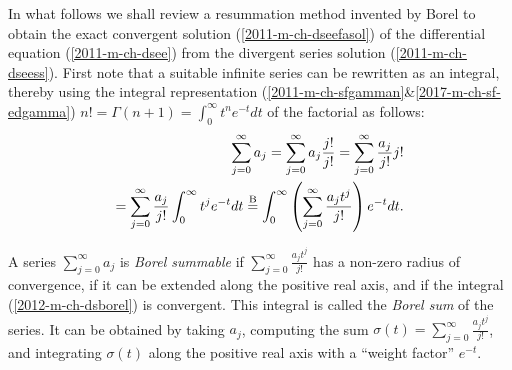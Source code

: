 In what follows we shall review
a resummation method
invented by Borel\cite[-13mm]{Borel1899}
to obtain the exact convergent solution
(\ref{2011-m-ch-dseefasol})
of the differential equation  (\ref{2011-m-ch-dsee})
from the divergent series solution (\ref{2011-m-ch-dseess}).
First note that a suitable infinite series  can be rewritten as an integral,
thereby using the integral representation
(\ref{2011-m-ch-sfgamman}\&\ref{2017-m-ch-sf-edgamma})
$
n! = \Gamma ( n+1 ) =
\int_0^\infty t^{n}e^{-t}dt
$
of the factorial
as follows:
\begin{equation}
\begin{split}
\sum_{j=0}^\infty
a_j
=
\sum_{j=0}^\infty
a_j  \frac{j!}{j!}
=
\sum_{j=0}^\infty
  \frac{a_j}{j!}  j!
\\
=
\sum_{j=0}^\infty
  \frac{a_j}{j!}  \int_0^\infty t^j e^{-t} dt
\stackrel{{\rm B}}{=}
\int_0^\infty \left(\sum_{j=0}^\infty   \frac{a_j t^j}{j!}\right)   e^{-t} dt
.
\end{split}
\label{2012-m-ch-dsborel}
\end{equation}



A series  $\sum_{j=0}^\infty   a_j $
is {\em Borel summable}
if
$\sum_{j=0}^\infty   \frac{a_j t^j}{j!}$ has a non-zero radius of convergence,
if it can be extended along the positive real axis, and if the integral
(\ref{2012-m-ch-dsborel}) is convergent.
This integral is called the
{\em Borel sum}
of the series.
It can be obtained by taking $a_j$, computing the sum $\sigma (t) = \sum_{j=0}^\infty   \frac{a_j t^j}{j!}$,
and integrating $\sigma (t)$ along the positive real axis with a ``weight factor'' $e^{-t}$.


